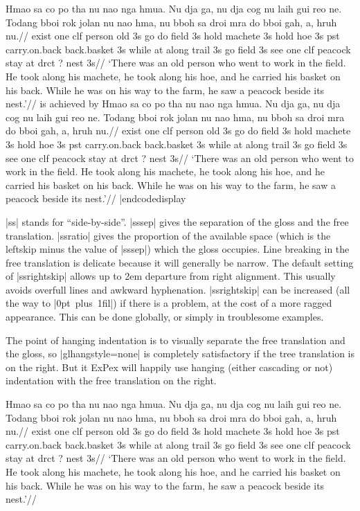 \framedisplay
\ex[glftpos=right,glhangstyle=none]
\begingl
\gla
Hmao sa co po tha  nu nao nga hmua. Nu dja ga, nu dja cog nu laih
gui reo ne. Todang bboi rok jolan nu nao hma, nu bboh sa droi mra
do bboi gah, a, hruh nu.//
\glb
exist one {clf} person old 3s go do field 3s hold machete 3s hold
hoe 3s pst carry.on.back back.basket 3s while at {along} trail 3s
go field 3s see one clf peacock stay at drct {?} nest 3s//
\glft
`There was an old person who went to work in the field. He took
along his machete, he took along his hoe, and he carried his
basket on his back. While he was on his way to the farm, he saw a
peacock beside its nest.'//
\endgl
\xe
\endframedisplay
\noindent is achieved by
\codedisplay
\ex[glftpos=right,glhangstyle=none]
\begingl
\gla
Hmao sa co po tha  nu nao nga hmua. Nu dja ga, nu dja cog nu laih
gui reo ne. Todang bboi rok jolan nu nao hma, nu bboh sa droi mra
do bboi gah, a, hruh nu.//
\glb
exist one {clf} person old 3s go do field 3s hold machete 3s hold
hoe 3s pst carry.on.back back.basket 3s while at {along} trail 3s
go field 3s see one clf peacock stay at drct {?} nest 3s//
\glft
`There was an old person who went to work in the field. He took
along his machete, he took along his hoe, and he carried his
basket on his back. While he was on his way to the farm, he saw a
peacock beside its nest.'//
\endgl
\xe
|endcodedisplay

|ss| stands for ``side-by-side''.
|sssep| gives the separation of the gloss and the free
translation. |ssratio| gives the proportion of the available
space (which is the leftskip minus the value of |sssep|) which
the gloss occupies.  Line breaking in the free translation is
delicate because it will generally be narrow. The default setting
of |ssrightskip| allows  up to 2em departure from right
alignment. This usually avoids overfull lines and awkward
hyphenation.  |ssrightskip| can be increased (all the way to
\hbox{|0pt plus 1fil|}) if there is a problem, at the cost of a
more ragged appearance.  This can be done globally, or simply in
troublesome examples.

The point of hanging indentation is to visually separate the free
translation and the gloss, so |glhangstyle=none| is completely
satisfactory if the tree translation is on the right. But {it
ExPex\/} will happily use hanging (either cascading or not)
indentation with the free translation on the right.


\framedisplay
\ex[glftpos=right,glhangstyle=none,ssratio=.7,sssep=1.5em,
ssrightskip=0pt plus .4em]
\begingl
\gla
Hmao sa co po tha  nu nao nga hmua. Nu dja ga, nu dja cog nu laih
gui reo ne. Todang bboi rok jolan nu nao hma, nu bboh sa droi mra
do bboi gah, a, hruh nu.//
\glb
exist one {clf} person old 3s go do field 3s hold machete 3s hold
hoe 3s pst carry.on.back back.basket 3s while at {along} trail 3s
go field 3s see one clf peacock stay at drct {?} nest 3s//
\glft
`There was an old person who went to work in the field. He took
along his machete, he took along his hoe, and he carried his
basket on his back. While he was on his way to the farm, he saw a
peacock beside its nest.'//
\endgl
\xe
\endframedisplay

